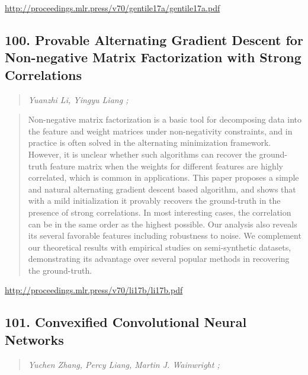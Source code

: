 \documentclass{article}
\begin{document}
\href{http://proceedings.mlr.press/v70/gentile17a/gentile17a.pdf}{http://proceedings.mlr.press/v70/gentile17a/gentile17a.pdf}

\subsection{100. Provable Alternating Gradient Descent for Non-negative Matrix Factorization with Strong Correlations}

\begin{quote}
\footnotesize{\textit{Yuanzhi Li, Yingyu Liang ;}}
\end{quote}

\begin{quote}
    Non-negative matrix factorization is a basic tool for decomposing data into the feature and weight matrices under non-negativity constraints, and in practice is often solved in the alternating minimization framework. However, it is unclear whether such algorithms can recover the ground-truth feature matrix when the weights for different features are highly correlated, which is common in applications. This paper proposes a simple and natural alternating gradient descent based algorithm, and shows that with a mild initialization it provably recovers the ground-truth in the presence of strong correlations. In most interesting cases, the correlation can be in the same order as the highest possible. Our analysis also reveals its several favorable features including robustness to noise. We complement our theoretical results with empirical studies on semi-synthetic datasets, demonstrating its advantage over several popular methods in recovering the ground-truth.  \end{quote}

\href{http://proceedings.mlr.press/v70/li17b/li17b.pdf}{http://proceedings.mlr.press/v70/li17b/li17b.pdf}

\subsection{101. Convexified Convolutional Neural Networks}

\begin{quote}
\footnotesize{\textit{Yuchen Zhang, Percy Liang, Martin J. Wainwright ;}}
\end{quote}
\end{document}
